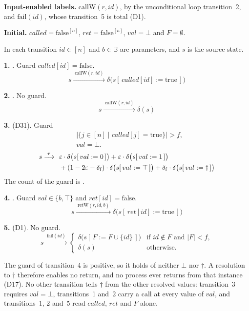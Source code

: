 \noindent\textbf{Input-enabled labels.}
$\mathrm{callW}(r,id)$, by the unconditional loop transition~2, and $\mathrm{fail}(id)$, whose transition~5 is total (D1).

\noindent\textbf{Initial.}
$called = \mathrm{false}^{[n]}$, $ret = \mathrm{false}^{[n]}$, $val = \bot$ and $F = \emptyset$.

\medskip
\noindent In each transition $id \in [n]$ and $b \in \mathbb{B}$ are parameters, and $s$ is the source state.

\medskip
\noindent\textbf{1.} .
Guard $called[id] = \mathrm{false}$.
\[ s \xrightarrow{\;\mathrm{callW}(r,id)\;} \delta\bigl(s[\,called[id] := \mathrm{true}\,]\bigr) \]

\noindent\textbf{2.} .
No guard.
\[ s \xrightarrow{\;\mathrm{callW}(r,id)\;} \delta(s) \]

\noindent\textbf{3.}  (D31).
Guard
\[ \begin{aligned}
     &\bigl|\{j \in [n] \mid called[j] = \mathrm{true}\}\bigr| > f,\\
     &val = \bot.
   \end{aligned} \]
\[ \begin{aligned}
     s \xrightarrow{\;\tau\;}\ \
     &\varepsilon\cdot\delta\bigl(s[\,val := 0\,]\bigr)
     + \varepsilon\cdot\delta\bigl(s[\,val := 1\,]\bigr)\\
     &{}+ (1-2\varepsilon-\delta_{\mathrm{f}})\cdot\delta\bigl(s[\,val := \top\,]\bigr)
     + \delta_{\mathrm{f}}\cdot\delta\bigl(s[\,val := \dagger\,]\bigr)
   \end{aligned} \]
The count of the guard is .

\noindent\textbf{4.} .
Guard $val \in \{b, \top\}$ and $ret[id] = \mathrm{false}$.
\[ s \xrightarrow{\;\mathrm{retW}(r,id,b)\;}
   \delta\bigl(s[\,ret[id] := \mathrm{true}\,]\bigr) \]

\noindent\textbf{5.}  (D1).
No guard.
\[ s \xrightarrow{\;\mathrm{fail}(id)\;}
   \begin{cases}
     \delta\bigl(s[\,F := F \cup \{id\}\,]\bigr)
       & \text{if } id \notin F \text{ and } |F| < f,\\
     \delta(s) & \text{otherwise.}
   \end{cases} \]

\medskip
\noindent The guard of transition~4 is positive, so it holds of neither $\bot$ nor $\dagger$.
A resolution to $\dagger$ therefore enables no return, and no process ever returns from that instance (D17).
No other transition tells $\dagger$ from the other resolved values: transition~3 requires $val = \bot$, transitions~1 and~2 carry a call at every value of $val$, and transitions~1, 2 and~5 read $called$, $ret$ and $F$ alone.

